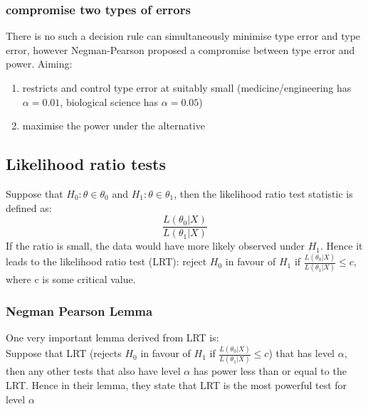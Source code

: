 \documentclass[12pt ]{article}
\newcommand{\RomanNumeralCaps}[1] {\MakeUppercase{\romannumeral #1}}
\begin{document}
\subsubsection{compromise two types of errors}
There is no such a decision rule can simultaneously minimise type \RomanNumeralCaps{1} error and type \RomanNumeralCaps{2} error, however Negman-Pearson proposed a compromise between type \RomanNumeralCaps{1} error and power.
Aiming:
\begin{enumerate} 
\item restricts and control type \RomanNumeralCaps{1} error at suitably small (medicine/engineering has $\alpha = 0.01$, biological science has $\alpha = 0.05$)
\item maximise the power under the alternative
\end{enumerate}

\subsection{Likelihood ratio tests}
Suppose that $H_{0} : \theta \in \theta_{0}$ and $H_{1} : \theta \in \theta_{1}$, then the likelihood ratio test statistic is defined as:
\begin{equation*}
\frac{L(\theta_{0} | X)}{L(\theta_{1} | X)}
\end{equation*}
If the ratio is small, the data would have more likely observed under $H_{1}$. Hence it leads to the likelihood ratio test (LRT): reject $H_{0}$ in favour of $H_{1}$ if $\frac{L(\theta_{0} | X)}{L(\theta_{1} | X)} \leq c$, where c is some critical value.
\subsubsection{Negman Pearson Lemma}
One very important lemma derived from LRT is: \\
Suppose that LRT (rejects $H_{0}$ in favour of $H_{1}$ if $\frac{L(\theta_{0} | X)}{L(\theta_{1} | X)} \leq c$) that has level $\alpha$, then any other tests that also have level $\alpha$ has power less than or equal to the LRT. Hence in their lemma, they state that LRT is the most powerful test for level $\alpha$
\end{document}
